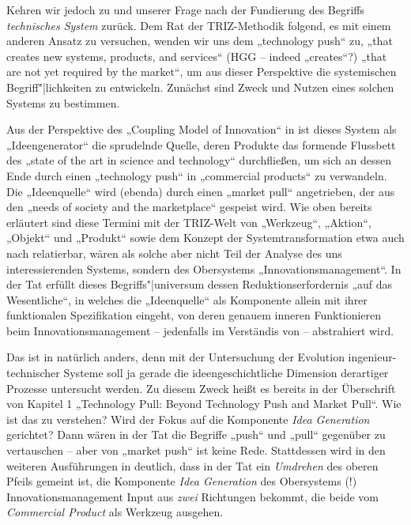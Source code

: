 \documentclass[11pt,a4paper]{article}
\begin{document}
Kehren wir jedoch zu \cite{TESE2018} und unserer Frage nach der Fundierung des
Begriffs \emph{technisches System} zurück. Dem Rat der TRIZ-Methodik folgend,
es mit einem anderen Ansatz zu versuchen, wenden wir uns dem „technology push“
\cite[S. 2]{TESE2018} zu, „that creates new systems, products, and services“
(HGG -- indeed „creates“?) „that are not yet required by the market“, um aus
dieser Perspektive die systemischen Begriff"|lichkeiten zu entwickeln.
Zunächst sind Zweck und Nutzen eines solchen Systems zu bestimmen.

Aus der Perspektive des „Coupling Model of Innovation“ in
\cite[Fig. 3]{Preez2006} ist dieses System als „Ideengenerator“ die sprudelnde
Quelle, deren Produkte das formende Flussbett des „state of the art in science
and technology“ durchfließen, um sich an dessen Ende durch einen „technology
push“ in „commercial products“ zu verwandeln.  Die „Ideenquelle“ wird (ebenda)
durch einen „market pull“ angetrieben, der aus den „needs of society and the
marketplace“ gespeist wird. Wie oben bereits erläutert sind diese Termini mit
der TRIZ-Welt von „Werkzeug“, „Aktion“, „Objekt“ und „Produkt“ sowie dem
Konzept der Systemtransformation etwa auch nach \cite{TT} relatierbar, wären
als solche aber nicht Teil der Analyse des uns interessierenden Systems,
sondern des Obersystems „Innovationsmanagement“. In der Tat erfüllt dieses
Begriffs"|universum dessen Reduktionserfordernis „auf das Wesentliche“, in
welches die „Ideenquelle“ als Komponente allein mit ihrer funktionalen
Spezifikation eingeht, von deren genauem inneren Funktionieren beim
Innovationsmanagement -- jedenfalls im Verständis von \cite{Preez2006} --
abstrahiert wird.

Das ist in \cite{TESE2018} natürlich anders, denn mit der Untersuchung der
Evolution ingenieur-technischer Systeme soll ja gerade die ideengeschichtliche
Dimension derartiger Prozesse untersucht werden.  Zu diesem Zweck heißt es
bereits in der Überschrift von Kapitel 1 „Technology Pull: Beyond Technology
Push and Market Pull“.  Wie ist das zu verstehen? Wird der Fokus auf die
Komponente \emph{Idea Generation} gerichtet? Dann wären in der Tat die
Begriffe „push“ und „pull“ gegenüber \cite{Preez2006} zu vertauschen -- aber
von „market push“ ist keine Rede.  Stattdessen wird in den weiteren
Ausführungen in \cite{TESE2018} deutlich, dass in der Tat ein \emph{Umdrehen}
des oberen Pfeils gemeint ist, die Komponente \emph{Idea Generation} des
Obersystems (!) Innovationsmanagement Input aus \emph{zwei} Richtungen
bekommt, die beide vom \emph{Commercial Product} als Werkzeug ausgehen.
\end{document}
